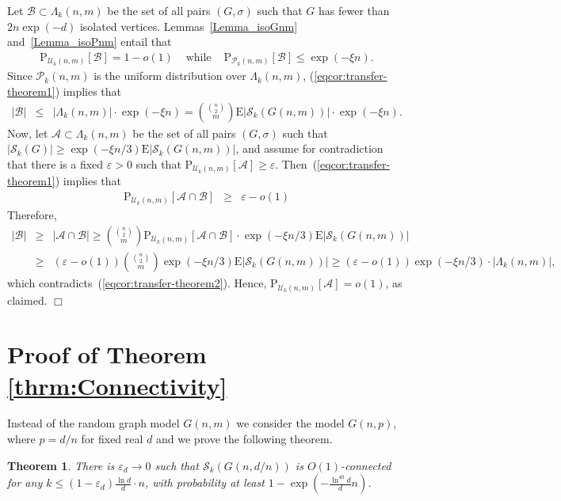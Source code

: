 \documentclass[a4paper,10pt]{article}
\newcommand{\qed}{\hfill$\Box$\smallskip}
\newtheorem{theorem}{Theorem}\renewcommand{\thetheorem}{\arabic{theorem}}
\newcommand\cA{\mathcal{A}}
\newcommand\cB{\mathcal{B}}
\newcommand\cU{\mathcal{U}}
\newcommand\cS{\mathcal{S}}
\newcommand\cP{\mathcal{P}}
\newcommand\eps{\varepsilon}
\newcommand\Erw{\mathrm{E}}
\newcommand\pr{\mathrm{P}}
\newcommand{\bink}[2] {{{#1}\choose {#2}}}
\newcommand\ra{\rightarrow}
\newcommand\brk[1]{\left\lbrack{#1}\right\rbrack}
\newcommand\abs[1]{\left|{#1}\right|}
\newcommand\Lem{Lemma}
\begin{document}
Let $\cB\subset\Lambda_k(n,m)$ be the set of all pairs $(G,\sigma)$
such that $G$ has fewer than $2n\exp(-d)$ isolated vertices. \Lem s~\ref{Lemma_isoGnm} and~\ref{Lemma_isoPnm} entail that 
\begin{eqnarray}\label{eqcor:transfer-theorem1}
	\pr_{\cU_k(n,m)}\brk\cB=1-o(1)&\mbox{ while }&\pr_{\cP_k(n,m)}\brk\cB\leq\exp(-\xi n).
\end{eqnarray}
Since $\cP_k(n,m)$ is the uniform distribution over $\Lambda_k(n,m)$,
(\ref{eqcor:transfer-theorem1}) implies that 
\begin{eqnarray}\label{eqcor:transfer-theorem2}
	\abs\cB&\leq&\abs{\Lambda_k(n,m)}\cdot\exp(-\xi n)=\bink{\bink{n}2}m\Erw|\cS_k(G(n,m))|\cdot\exp(-\xi n).
\end{eqnarray}
Now, let $\cA\subset\Lambda_k(n,m)$ be the set of all pairs
$(G,\sigma)$ such that 	$|\cS_k(G)|\geq\exp(-\xi n/3)\Erw|\cS_k(G(n,m))|$,
and assume for contradiction that there is a fixed $\eps>0$ such
that $\pr_{\cU_k(n,m)}\brk{\cA}\geq\eps$. Then~(\ref{eqcor:transfer-theorem1})
implies that
\begin{eqnarray*}\label{eqcor:transfer-theorem3}
	\pr_{\cU_k(n,m)}\brk{\cA\cap\cB}&\geq&\eps-o(1) \end{eqnarray*}
Therefore,
\begin{eqnarray*}
	\abs\cB&\geq&\abs{\cA\cap\cB}\geq \bink{\bink n2}{m}\pr_{\cU_k(n,m)}\brk{\cA\cap\cB}\cdot\exp(-\xi n/3)\Erw|\cS_k(G(n,m))|\\
		&\geq&(\eps-o(1))\bink{\bink n2}{m}\exp(-\xi n/3)\Erw|\cS_k(G(n,m))|\geq(\eps-o(1))\exp(-\xi n/3)\cdot\abs{\Lambda_k(n,m)},
\end{eqnarray*}
which contradicts~(\ref{eqcor:transfer-theorem2}). Hence, $\pr_{\cU_k(n,m)}\brk{\cA}=o(1)$,
as claimed.
\qed








\section{Proof of Theorem \ref{thrm:Connectivity}}\label{section:thrm:Connectivity}


Instead of the random graph model $G(n,m)$  we consider the model $G(n,p)$, 
where $p=d/n$ for fixed real $d$ and we prove the following theorem.

\begin{theorem}\label{thrm:ConnectivityGnp}
There is $\eps_d\ra0$ such that $\cS_k(G(n,d/n))$ is $O(1)$-connected 
for any $k\leq(1-\eps_d)\frac{\ln d}d\cdot n$, with probability at least 
$1-\exp\left(-\frac{\ln^{40}d}{d}n\right)$.
\end{theorem}
\end{document}
